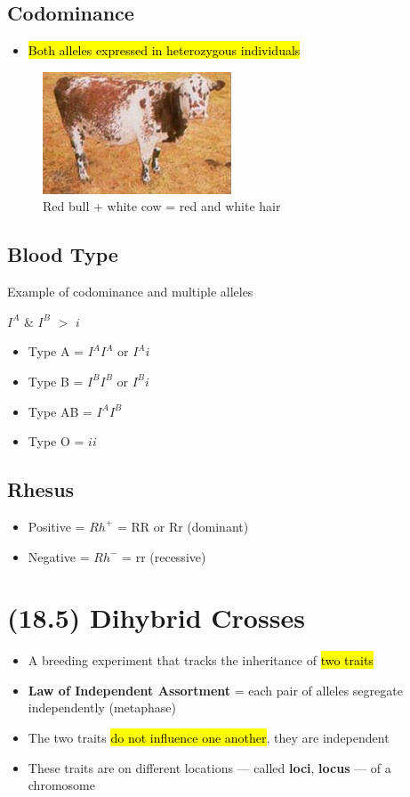 \documentclass[a4paper,12pt]{article}
\begin{document}
\subsection{Codominance}
\begin{itemize}
    \item{\hl{Both alleles expressed in heterozygous individuals}}
\end{itemize}

\begin{figure}[H]
    \centering
    \includegraphics[width=0.50\textwidth]{codom}
    \caption{Red bull + white cow = red and white hair}
\end{figure}

\subsection{Blood Type}
Example of codominance and multiple alleles

$I^A$ \& $I^B$ $>$ $i$
\begin{itemize}
    \item{Type A = $I^AI^A$ or $I^Ai$}
    \item{Type B = $I^BI^B$ or $I^Bi$}
    \item{Type AB = $I^AI^B$}
    \item{Type O = $ii$}
\end{itemize}

\subsection{Rhesus}
\begin{itemize}
    \item{Positive = $Rh^+$ = RR or Rr (dominant)}
    \item{Negative = $Rh^-$ = rr (recessive)}
\end{itemize}

\pagebreak

\section{(18.5) Dihybrid Crosses}
\begin{itemize}
    \item{A breeding experiment that tracks the inheritance of \hl{two traits}}
    \item{\textbf{Law of Independent Assortment} = each pair of alleles segregate independently (metaphase)}
    \item{The two traits \hl{do not influence one another}, they are independent}
    \item{These traits are on different locations --- called \textbf{loci}, \textbf{locus} --- of a chromosome}
\end{itemize}
\end{document}
